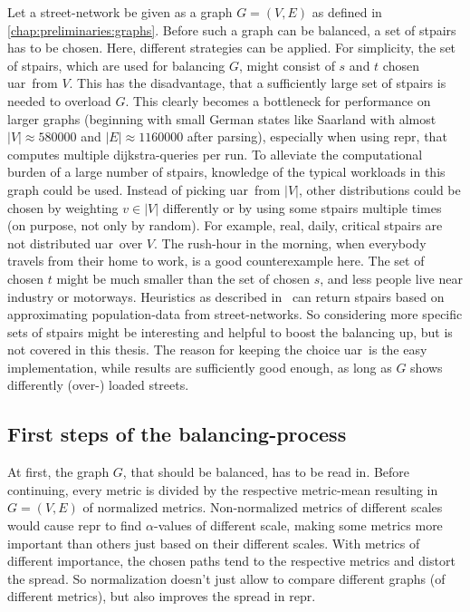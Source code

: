         Let a street-network be given as a graph $G = (V, E)$ as defined in \cref{chap:preliminaries:graphs}.
        Before such a graph can be balanced, a set of \glspl{stpair} has to be chosen.
        Here, different strategies can be applied.
        For simplicity, the set of \glspl{stpair}, which are used for balancing $G$, might consist of $s$ and $t$ chosen \gls{uar}\ from $V$.
        This has the disadvantage, that a sufficiently large set of \glspl{stpair} is needed to overload $G$.
        This clearly becomes a bottleneck for performance on larger graphs (beginning with small German states like Saarland with almost $|V| \approx \num{580000}$ and $|E| \approx \num{1160000}$ after parsing), especially when using \gls{repr}, that computes multiple \gls{dijkstra}-queries per run.
        To alleviate the computational burden of a large number of \glspl{stpair}, knowledge of the typical workloads in this graph could be used.
        Instead of picking \gls{uar}\ from $|V|$, other distributions could be chosen by weighting $v \in |V|$ differently or by using some \glspl{stpair} multiple times (on purpose, not only by random).
        For example, real, daily, critical \glspl{stpair} are not distributed \gls{uar}\ over $V$.
        The rush-hour in the morning, when everybody travels from their home to work, is a good counterexample here.
        The set of chosen $t$ might be much smaller than the set of chosen $s$, and less people live near industry or motorways.
        Heuristics as described in~\cite{bakillah:population_from_osm} can return \glspl{stpair} based on approximating population-data from street-networks.
        So considering more specific sets of \glspl{stpair} might be interesting and helpful to boost the \gls{balancing} up, but is not covered in this thesis.
        The reason for keeping the choice \gls{uar}\ is the easy implementation, while results are sufficiently good enough, as long as $G$ shows differently (over-) loaded streets.

    \subsection{First steps of the balancing-process}

        At first, the graph $G$, that should be balanced, has to be read in.
        Before continuing, every \gls{metric} is divided by the respective \gls{metric}-mean resulting in $G = (V, E)$ of normalized \glspl{metric}.
        Non-normalized \glspl{metric} of different scales would cause \gls{repr} to find $\alpha$-values of different scale, making some \glspl{metric} more important than others just based on their different scales.
        With \glspl{metric} of different importance, the chosen paths tend to the respective \glspl{metric} and distort the spread.
        So normalization doesn't just allow to compare different graphs (of different \glspl{metric}), but also improves the spread in \gls{repr}.

